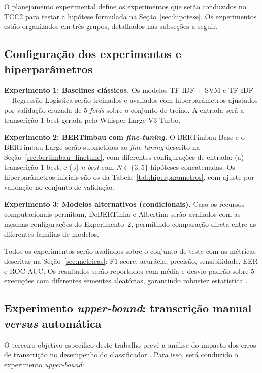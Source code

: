\documentclass[
    12pt,                %
    openright,           %
    oneside,             %
    a4paper,             %
    english,             %
    brazil               %
]{abntex2}
\begin{document}
O planejamento experimental define os experimentos que serão conduzidos no TCC2 para testar a hipótese formulada na Seção~\ref{sec:hipotese}. Os experimentos estão organizados em três grupos, detalhados nas subseções a seguir.

\subsection{Configuração dos experimentos e hiperparâmetros}
\label{sec:experimentos_config}

\textbf{Experimento 1: Baselines clássicos.}
Os modelos TF-IDF + SVM e TF-IDF + Regressão Logística serão treinados e avaliados com hiperparâmetros ajustados por validação cruzada de 5 \textit{folds} sobre o conjunto de treino. A entrada será a transcrição 1-best gerada pelo Whisper Large V3 Turbo.

\textbf{Experimento 2: BERTimbau com \textit{fine-tuning}.}
O BERTimbau Base e o BERTimbau Large serão submetidos ao \textit{fine-tuning} descrito na Seção~\ref{sec:bertimbau_finetune}, com diferentes configurações de entrada: (a) transcrição 1-best; e (b) \textit{n-best} com $N \in \{3, 5\}$ hipóteses concatenadas. Os hiperparâmetros iniciais são os da Tabela~\ref{tab:hiperparametros}, com ajuste por validação no conjunto de validação.

\textbf{Experimento 3: Modelos alternativos (condicionais).}
Caso os recursos computacionais permitam, DeBERTinha \cite{Abonizio2023} e Albertina \cite{Rodrigues2023} serão avaliados com as mesmas configurações do Experimento~2, permitindo comparação direta entre as diferentes famílias de modelos.

Todos os experimentos serão avaliados sobre o conjunto de teste com as métricas descritas na Seção~\ref{sec:metricas}: F1-score, acurácia, precisão, sensibilidade, EER e ROC-AUC. Os resultados serão reportados com média e desvio padrão sobre 5 execuções com diferentes sementes aleatórias, garantindo robustez estatística \cite{Wazlawick2020}.

\subsection{Experimento \textit{upper-bound}: transcrição manual
\textit{versus} automática}
\label{sec:upper_bound}

O terceiro objetivo específico deste trabalho prevê a análise do impacto dos erros de transcrição no desempenho do classificador \cite{Dighe2024}. Para isso, será conduzido o experimento \textit{upper-bound}:
\end{document}
